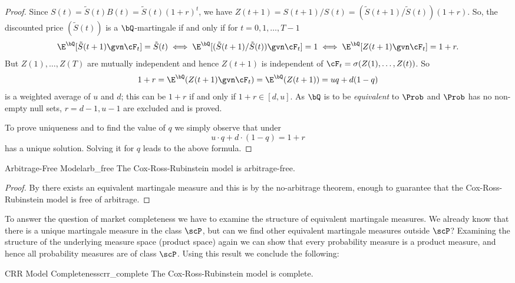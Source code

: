 \begin{proof}
	Since \(S(t) = \tilde{S}(t)B(t) = \tilde{S}(t)(1+r)^t\), we have \(Z(t+1) = S(t+1)/S(t) = (\tilde{S}(t+1)/\tilde{S}(t))(1+r)\). So, the discounted price \((\tilde{S}(t))\) is a \(\bQ\)-martingale if and only if for \(t = 0, 1, \dots, T-1\)
	\[
		\E^{\bQ}[\tilde{S}(t+1) \gvn \cF_t] = \tilde{S}(t) \iff \E^{\bQ}[(\tilde{S}(t+1)/\tilde{S}(t)) \gvn \cF_t] = 1 \iff \E^{\bQ}[Z(t+1) \gvn \cF_t] = 1+r.
	\]
	But \(Z(1), \dots, Z(T)\) are mutually independent and hence \(Z(t+1)\) is independent of \(\cF_t = \sigma(Z(1), \dots, Z(t))\). So
	\[
		1+r = \E^{\bQ}(Z(t+1) \gvn \cF_t) = \E^{\bQ}(Z(t+1)) = uq + d(1-q)
	\]
	is a weighted average of \(u\) and \(d\); this can be \(1+r\) if and only if \(1+r \in [d, u]\). As \(\bQ\) is to be \textit{equivalent} to \(\Prob\) and \(\Prob\) has no non-empty null sets, \(r=d-1, u-1\) are excluded and  is proved.

	To prove uniqueness and to find the value of \(q\) we simply observe that under 
	\[
		u \cdot q + d \cdot (1-q) = 1+r
	\]
	has a unique solution. Solving it for \(q\) leads to the above formula.
\end{proof}

\begin{cor}{Arbitrage-Free Model}{arb_free}
	The Cox-Ross-Rubinstein model is arbitrage-free.
\end{cor}

\begin{proof}
	By  there exists an equivalent martingale measure and this is by the no-arbitrage theorem,  enough to guarantee that the Cox-Ross-Rubinstein model is free of arbitrage.
\end{proof}

To answer the question of market completeness we have to examine the structure of equivalent martingale measures. We already know that there is a unique martingale measure in the class \(\scP\), but can we find other equivalent martingale measures outside \(\scP\)? Examining the structure of the underlying measure space (product space) again we can show that every probability measure is a product measure, and hence all probability measures are of class \(\scP\). Using this result we conclude the following:

\begin{prop}{CRR Model Completeness}{crr_complete}
	The Cox-Ross-Rubinstein model is complete.
\end{prop}

